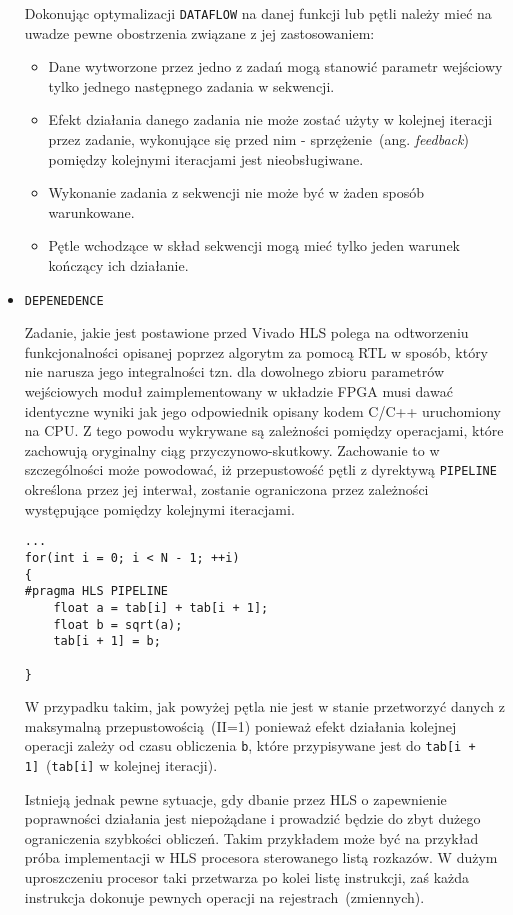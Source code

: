 \begin{itemize}
Dokonując optymalizacji \texttt{DATAFLOW} na danej funkcji lub pętli należy mieć na uwadze pewne obostrzenia związane z jej zastosowaniem:
\begin{itemize}
\item Dane wytworzone przez jedno z zadań mogą stanowić parametr wejściowy tylko jednego następnego zadania w sekwencji.
\item Efekt działania danego zadania nie może zostać użyty w kolejnej iteracji przez zadanie, wykonujące się przed nim - sprzężenie~(ang. \textit{feedback}) pomiędzy kolejnymi iteracjami jest nieobsługiwane. 
\item Wykonanie zadania z sekwencji nie może być w żaden sposób warunkowane.
\item Pętle wchodzące w skład sekwencji mogą mieć tylko jeden warunek kończący ich działanie.
\end{itemize}

\item \texttt{DEPENEDENCE}

Zadanie, jakie jest postawione przed Vivado HLS polega na odtworzeniu funkcjonalności opisanej poprzez algorytm za pomocą RTL w sposób, który nie narusza jego integralności tzn. dla dowolnego zbioru parametrów wejściowych moduł zaimplementowany w układzie FPGA musi dawać identyczne wyniki jak jego odpowiednik opisany kodem C/C++ uruchomiony na CPU. Z tego powodu wykrywane są zależności pomiędzy operacjami, które zachowują oryginalny ciąg przyczynowo-skutkowy. Zachowanie to w szczególności może powodować, iż przepustowość pętli z dyrektywą \texttt{PIPELINE} określona przez jej interwał, zostanie ograniczona przez zależności występujące pomiędzy kolejnymi iteracjami.

\begin{lstlisting}[caption=Zależność interwału pętli od występujących zależności pomiędzy kolejnymi iteracjami]
...
for(int i = 0; i < N - 1; ++i)
{
#pragma HLS PIPELINE
	float a = tab[i] + tab[i + 1];
	float b = sqrt(a);
	tab[i + 1] = b;
	
}
\end{lstlisting}
W przypadku takim, jak powyżej pętla nie jest w stanie przetworzyć danych z maksymalną przepustowością~(II=1) ponieważ efekt działania kolejnej operacji zależy od czasu obliczenia \texttt{b}, które przypisywane jest do \texttt{tab[i + 1]}~(\texttt{tab[i]} w kolejnej iteracji). 

Istnieją jednak pewne sytuacje, gdy dbanie przez HLS o zapewnienie poprawności działania jest niepożądane i prowadzić będzie do zbyt dużego ograniczenia szybkości obliczeń. Takim przykładem może być na przykład próba implementacji w HLS procesora sterowanego listą rozkazów. W dużym uproszczeniu procesor taki przetwarza po kolei listę instrukcji, zaś każda instrukcja dokonuje pewnych operacji na rejestrach~(zmiennych). 


\end{itemize}
